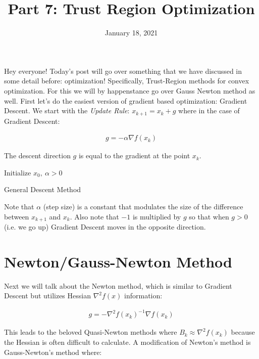 \documentclass[12pt]{article}
\title{\textbf{Part 7: Trust Region Optimization}}
\begin{document}
\date{January 18, 2021}
\maketitle

Hey everyone! Today's post will go over something that we have discussed in some detail before: optimization! Specifically, Trust-Region methods for convex optimization. For this we will by happenstance go over Gauss Newton method as well. First let's do the easiest version of gradient based optimization: Gradient Descent. We start with the \emph{Update Rule}: $x_{k+1}=x_k+g$ where in the case of Gradient Descent:

\begin{align*}
g=-\alpha\nabla f(x_k)
\end{align*}

\vspace{5mm}

The descent direction $g$ is equal to the gradient at the point $x_k$.

\vspace{5mm}

\begin{algorithm}[H]
Initialize $x_0, \: \alpha>0$\;
 \caption{General Descent Method}
\end{algorithm}

\vspace{5mm}

Note that $\alpha$ (step size) is a constant that modulates the size of the difference between $x_{k+1}$ and $x_k$. Also note that $-1$ is multiplied by $g$ so that when $g>0$ (i.e. we go up) Gradient Descent moves in the opposite direction.

\section{Newton/Gauss-Newton Method}

Next we will talk about the Newton method, which is similar to Gradient Descent but utilizes Hessian $\nabla^2 f(x)$ information:

\begin{align*}
g=-\nabla^2 f(x_k)^{-1} \nabla f(x_k)
\end{align*}

\vspace{5mm}

This leads to the beloved Quasi-Newton methods where $B_k \approx \nabla^2 f(x_k)$ because the Hessian is often difficult to calculate. A modification of Newton's method is Gauss-Newton's method where:
\end{document}

